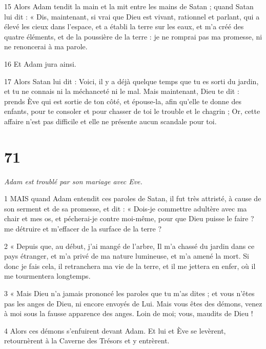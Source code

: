 \par 15 Alors Adam tendit la main et la mit entre les mains de Satan ; quand Satan lui dit : « Dis, maintenant, si vrai que Dieu est vivant, rationnel et parlant, qui a élevé les cieux dans l'espace, et a établi la terre sur les eaux, et m'a créé des quatre éléments, et de la poussière de la terre : je ne romprai pas ma promesse, ni ne renoncerai à ma parole.

\par 16 Et Adam jura ainsi.

\par 17 Alors Satan lui dit : Voici, il y a déjà quelque temps que tu es sorti du jardin, et tu ne connais ni la méchanceté ni le mal. Mais maintenant, Dieu te dit : prends Ève qui est sortie de ton côté, et épouse-la, afin qu'elle te donne des enfants, pour te consoler et pour chasser de toi le trouble et le chagrin ; Or, cette affaire n’est pas difficile et elle ne présente aucun scandale pour toi.

\chapter{71}

\par \textit{Adam est troublé par son mariage avec Eve.}

\par 1 MAIS quand Adam entendit ces paroles de Satan, il fut très attristé, à cause de son serment et de sa promesse, et dit : « Dois-je commettre adultère avec ma chair et mes os, et pécherai-je contre moi-même, pour que Dieu puisse le faire ? me détruire et m'effacer de la surface de la terre ?

\par 2 « Depuis que, au début, j'ai mangé de l'arbre, Il m'a chassé du jardin dans ce pays étranger, et m'a privé de ma nature lumineuse, et m'a amené la mort. Si donc je fais cela, il retranchera ma vie de la terre, et il me jettera en enfer, où il me tourmentera longtemps.

\par 3 « Mais Dieu n'a jamais prononcé les paroles que tu m'as dites ; et vous n'êtes pas les anges de Dieu, ni encore envoyés de Lui. Mais vous êtes des démons, venez à moi sous la fausse apparence des anges. Loin de moi; vous, maudits de Dieu !

\par 4 Alors ces démons s'enfuirent devant Adam. Et lui et Ève se levèrent, retournèrent à la Caverne des Trésors et y entrèrent.

